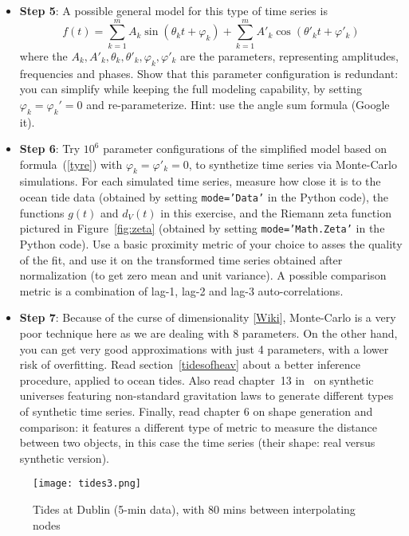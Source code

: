 \documentclass[oneside,10pt]{book}
\begin{document}
\begin{Exercise}
\begin{itemize}
\item[] {\bf Step 5}: A possible general model for this type of time series is
\begin{equation}
f(t) = \sum_{k=1}^m A_k \sin(\theta_kt + \varphi_k) + \sum_{k=1}^m A'_k \cos(\theta'_kt + \varphi'_k) \label{tyre}
\end{equation}
where the $A_k, A'_k, \theta_k,\theta'_k,\varphi_k,\varphi'_k$ are the parameters, representing amplitudes, frequencies and phases. Show that this parameter configuration is redundant:  you can simplify while keeping the full modeling capability, by setting
$\varphi_k = \varphi_k'=0$ and re-parameterize. Hint: use the angle sum formula (Google it).
\item[] {\bf Step 6}: Try $10^6$ parameter configurations of the simplified model based on formula~(\ref{tyre}) 
with $\varphi_k=\varphi'_k=0$, to
 synthetize time series via Monte-Carlo simulations. For each simulated time series, measure how close it is to the ocean tide data (obtained by setting \texttt{mode='Data'} in the Python code), the functions $g(t)$ and $d_V(t)$ in this exercise, and the Riemann zeta function pictured in Figure~\ref{fig:zeta} (obtained by setting
\texttt{mode='Math.Zeta'} in the Python code). Use a basic proximity metric of your choice to asses the quality of the fit, and use it 
on the transformed time series obtained after normalization (to get zero mean and unit variance). A possible comparison metric is
a combination of  lag-1, lag-2 and lag-3 auto-correlations.
\item[] {\bf Step 7}: Because of the \textcolor{index}{curse of dimensionality} [\href{https://en.wikipedia.org/wiki/Curse_of_dimensionality}{Wiki}], Monte-Carlo is a very poor technique here as we are dealing with $8$ parameters. On the other hand, you can get very good approximations with just 4 parameters, with a lower risk of overfitting. Read section~\ref{tidesofheav} about a better inference procedure, applied to ocean tides. 
Also read chapter~13 in~\cite{vgelsevier} on synthetic universes featuring non-standard gravitation laws to generate different types of  synthetic time series. Finally, read chapter 6 on shape generation and comparison: it features a different type of metric to measure the distance between two objects, in this case the time series (their shape: real versus synthetic version). 
\end{itemize}
\end{Exercise}


\begin{figure}%
\centering
\texttt{[image: tides3.png]} %
\caption{Tides at Dublin (5-min data), with 80 mins between interpolating nodes}
\label{fig:tides}
\end{figure}
\end{document}
